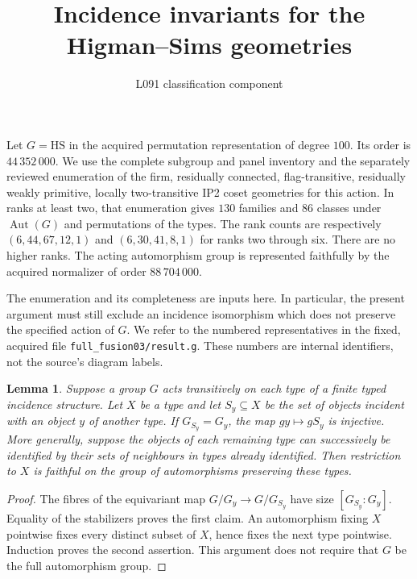 \documentclass[11pt]{article}
\title{Incidence invariants for the Higman--Sims geometries}
\author{L091 classification component}
\date{}
\newtheorem{lemma}{Lemma}
\newcommand{\Aut}{\operatorname{Aut}}
\newcommand{\HS}{\mathrm{HS}}
\begin{document}
\maketitle
Let $G=\HS$ in the acquired permutation representation of degree $100$.
Its order is $44\,352\,000$. We use the complete subgroup and panel
inventory and the separately reviewed enumeration of the firm, residually
connected, flag-transitive, residually weakly primitive, locally
two-transitive IP2 coset geometries for this action. In ranks at least two,
that enumeration gives $130$ families and $86$ classes under $\Aut(G)$
and permutations of the types. The rank counts are respectively
$(6,44,67,12,1)$ and $(6,30,41,8,1)$ for ranks two through six.
There are no higher ranks. The acting automorphism group is represented
faithfully by the acquired normalizer of order $88\,704\,000$.

The enumeration and its completeness are inputs here. In particular, the
present argument must still exclude an incidence isomorphism which does
not preserve the specified action of $G$. We refer to the numbered
representatives in the fixed, acquired file \texttt{full\_fusion03/result.g}.
These numbers are internal identifiers, not the source's diagram labels.

\begin{lemma}\label{shadows}
Suppose a group $G$ acts transitively on each type of a finite typed
incidence structure. Let $X$ be a type and let $S_y\subseteq X$ be the
set of objects incident with an object $y$ of another type. If
$G_{S_y}=G_y$, the map $gy\mapsto gS_y$ is injective. More generally,
suppose the objects of each remaining type can successively be
identified by their sets of neighbours in types already identified.
Then restriction to $X$ is faithful on the group of automorphisms
preserving these types.
\end{lemma}
\begin{proof}
The fibres of the equivariant map $G/G_y\longrightarrow G/G_{S_y}$
have size $[G_{S_y}:G_y]$. Equality of the stabilizers proves the first
claim. An automorphism fixing $X$ pointwise fixes every distinct subset
of $X$, hence fixes the next type pointwise. Induction proves the
second assertion. This argument does not require that $G$ be the full
automorphism group.
\end{proof}
\end{document}
